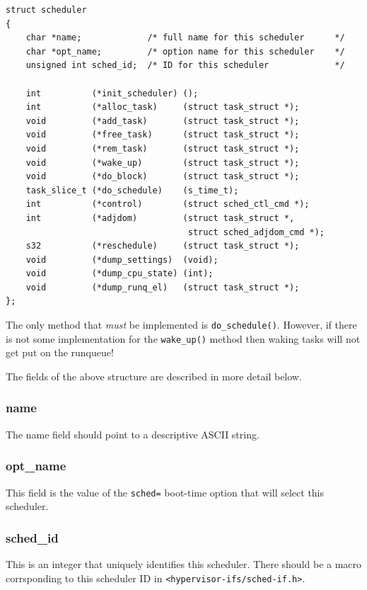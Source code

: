 \documentclass[11pt,twoside,final,openright]{xenstyle}
\begin{document}
\begin{verbatim}
struct scheduler
{
    char *name;             /* full name for this scheduler      */
    char *opt_name;         /* option name for this scheduler    */
    unsigned int sched_id;  /* ID for this scheduler             */

    int          (*init_scheduler) ();
    int          (*alloc_task)     (struct task_struct *);
    void         (*add_task)       (struct task_struct *);
    void         (*free_task)      (struct task_struct *);
    void         (*rem_task)       (struct task_struct *);
    void         (*wake_up)        (struct task_struct *);
    void         (*do_block)       (struct task_struct *);
    task_slice_t (*do_schedule)    (s_time_t);
    int          (*control)        (struct sched_ctl_cmd *);
    int          (*adjdom)         (struct task_struct *,
                                    struct sched_adjdom_cmd *);
    s32          (*reschedule)     (struct task_struct *);
    void         (*dump_settings)  (void);
    void         (*dump_cpu_state) (int);
    void         (*dump_runq_el)   (struct task_struct *);
};
\end{verbatim}

The only method that {\em must} be implemented is
{\tt do\_schedule()}.  However, if there is not some implementation for the
{\tt wake\_up()} method then waking tasks will not get put on the runqueue!

The fields of the above structure are described in more detail below.

\subsubsection{name}

The name field should point to a descriptive ASCII string.

\subsubsection{opt\_name}

This field is the value of the {\tt sched=} boot-time option that will select
this scheduler.

\subsubsection{sched\_id}

This is an integer that uniquely identifies this scheduler.  There should be a
macro corrsponding to this scheduler ID in {\tt <hypervisor-ifs/sched-if.h>}.
\end{document}
